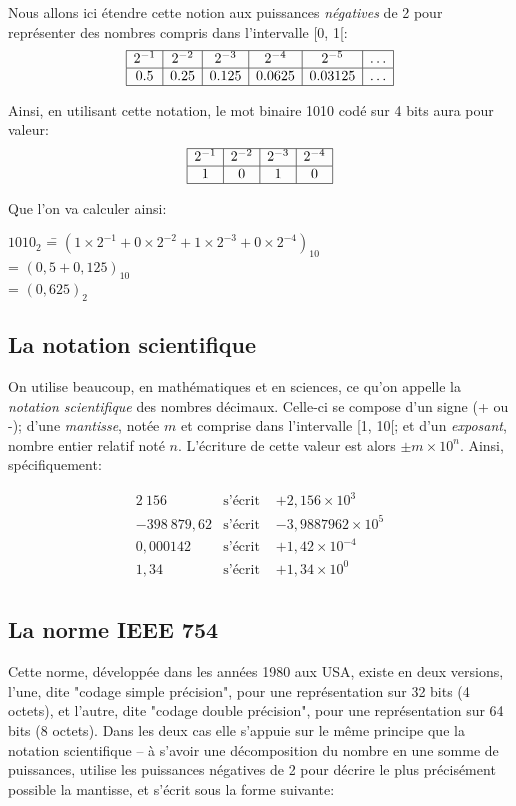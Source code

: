 \documentclass[12pt]{article}
\begin{document}
	Nous allons ici étendre cette notion aux puissances \textit{négatives} de 2 pour représenter des nombres compris dans l'intervalle [0, 1[:
	 \[
	\begin{array}{|c|c|c|c|c|c|}
		\hline
		2^{-1} & 2^{-2} & 2^{-3} & 2^{-4} &  2^{-5} & \ldots \\
		\hline
		0.5 & 0.25 & 0.125 & 0.0625 & 0.03125 &  \ldots \\
		\hline
	\end{array}
	\]
	
	Ainsi, en utilisant cette notation, le mot binaire 1010 codé sur 4 bits aura pour valeur:
		 \[
	\begin{array}{|c|c|c|c|}
		\hline
		2^{-1} & 2^{-2} & 2^{-3} & 2^{-4} \\
		\hline
		1 & 0 & 1 & 0  \\
		\hline
	\end{array}
	\]
	
	Que l'on va calculer ainsi:
	
	\begin{tabbing}
		$1010_{2}$ \==  $(1 \times 2^{-1} + 0 \times 2^{-2} + 1 \times 2^{-3} + 0 \times 2^{-4})_{10}$ \\
		\>= $(0,5 + 0,125)_{10}$ \\
		\>= $(0,625)_{2}$
	\end{tabbing}
	
	\subsection{La notation scientifique}
	On utilise beaucoup, en mathématiques et en sciences, ce qu'on appelle la \textit{notation scientifique} des nombres décimaux. Celle-ci se compose d'un signe (+ ou -); d'une \textit{mantisse}, notée $m$ et comprise dans l'intervalle [1, 10[; et d'un \textit{exposant}, nombre entier relatif noté $n$. L'écriture de cette valeur est alors $\pm m \times 10^n$. Ainsi, spécifiquement:
	
	\[
	\begin{array}{rll}
		2\ 156 & \text{s'écrit } & +2,156 \times 10^3 \\
		-398\ 879,62 & \text{s'écrit } & -3,9887962 \times 10^5 \\
		0,000142 & \text{s'écrit } & +1,42 \times 10^{-4} \\
		1,34 & \text{s'écrit } & +1,34 \times 10^0 \\
	\end{array}
	\]
	
	\subsection{La norme IEEE 754}
	Cette norme, développée dans les années 1980 aux USA, existe en deux versions, l'une, dite "codage simple précision", pour une représentation sur 32 bits (4 octets), et l'autre, dite "codage double précision", pour une représentation sur 64 bits (8 octets). Dans les deux cas elle s'appuie sur le même principe que la notation scientifique -- à s'avoir une décomposition du nombre en une somme de puissances, utilise les puissances négatives de 2 pour décrire le plus précisément possible la mantisse, et s'écrit sous la forme suivante:
	
\end{document}
